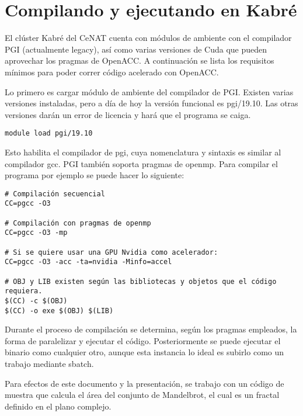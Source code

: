 \chapter{Compilando y ejecutando en Kabré}
El clúster Kabré del CeNAT cuenta con módulos de ambiente con el compilador PGI (actualmente legacy), así como varias versiones de Cuda que pueden aprovechar los pragmas de OpenACC. A continuación se lista los requisitos mínimos para poder correr código acelerado con OpenACC.

Lo primero es cargar módulo de ambiente del compilador de PGI. Existen varias versiones instaladas, pero a día de hoy la versión funcional es pgi/19.10. Las otras versiones darán un error de licencia y hará que el programa se caiga.

\begin{lstlisting}
module load pgi/19.10
\end{lstlisting}

Esto habilita el compilador de pgi, cuya nomenclatura y sintaxis es similar al compilador gcc. PGI también soporta pragmas de openmp. Para compilar el programa por ejemplo se puede hacer lo siguiente:

\begin{lstlisting}
# Compilación secuencial
CC=pgcc -O3

# Compilación con pragmas de openmp
CC=pgcc -O3 -mp

# Si se quiere usar una GPU Nvidia como acelerador:
CC=pgcc -O3 -acc -ta=nvidia -Minfo=accel 

# OBJ y LIB existen según las bibliotecas y objetos que el código requiera.
$(CC) -c $(OBJ)
$(CC) -o exe $(OBJ) $(LIB)

\end{lstlisting}

Durante el proceso de compilación se determina, según los pragmas empleados, la forma de paralelizar y ejecutar el código. Posteriormente se puede ejecutar el binario como cualquier otro, aunque esta instancia lo ideal es subirlo como un trabajo mediante sbatch.

Para efectos de este documento y la presentación, se trabajo con un código de muestra que calcula el área del conjunto de Mandelbrot, el cual es un fractal definido en el plano complejo.

